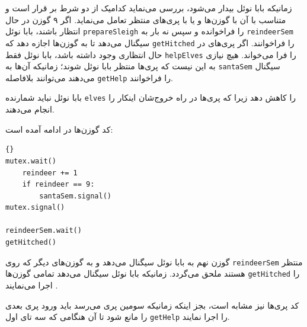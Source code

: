 \documentclass{book}
\begin{document}
    زمانیکه بابا نوئل بیدار می‌شود، بررسی می‌نماید کدامیک از دو شرط بر قرار است و متناسب با آن با گوزن‌ها  و یا با پری‌های منتظر تعامل می‌نماید. 
    اگر ۹ گوزن در حال انتظار باشند، بابا نوئل  {\tt prepareSleigh} را فراخوانده و سپس نه بار به {\tt reindeerSem} سیگنال می‌دهد تا به گوزن‌ها
    اجازه دهد که {\tt getHitched} را فراخوانند. اگر پری‌های در حال انتظاری وجود داشته باشد، بابا نوئل فقط {\tt helpElves} را فرا می‌خواند. 
    هیچ نیازی به این نیست که پری‌ها منتظر بابا نوئل شوند؛ زمانیکه آن‌ها به {\tt santaSem} سیگنال می‌دهند می‌توانند بلافاصله  {\tt getHelp}  را فراخوانند. 

    بابا نوئل نباید شمارنده {\tt elves} را کاهش دهد زیرا که پری‌ها در راه خروج‌شان اینکار را انجام می‌دهند. 

    کد گوزن‌ها در ادامه آمده است: 

\begin{latin}
\begin{latin}
\begin{lstlisting}[title=\rl{راه حل مساله بابا نوئل (گوزن‌ها)}]{}
mutex.wait()
    reindeer += 1
    if reindeer == 9:
        santaSem.signal()
mutex.signal()

reindeerSem.wait()
getHitched()
\end{lstlisting}
\end{latin}
\end{latin}

     گوزن نهم به بابا نوئل سیگنال می‌دهد و به گوزن‌های دیگر که روی  {\tt reindeerSem} منتظر هستند ملحق می‌گردد. 
     زمانیکه بابا نوئل سیگنال می‌دهد تمامی گوزن‌ها {\tt getHitched} را اجرا می‌نمایند .
    

    کد پری‌‌ها نیز مشابه است، بجز اینکه زمانیکه سومین پری می‌رسد باید ورود پری بعدی را مانع شود تا آن هنگامی که سه تای اول {\tt getHelp} را اجرا نمایند. 
\end{document}
